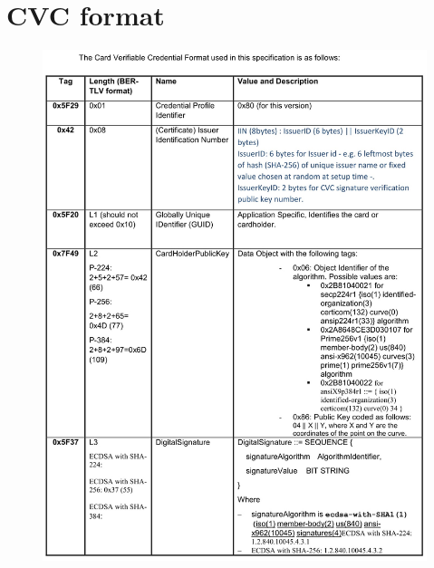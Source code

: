 \documentclass[12pt,a4paper]{article}
\begin{document}



\section{CVC format}
\label{cvc}
\begin{figure} [ht]
	\center
	\includegraphics[scale=0.4]{appendix/cvc-1}
\end{figure}
\end{document}
